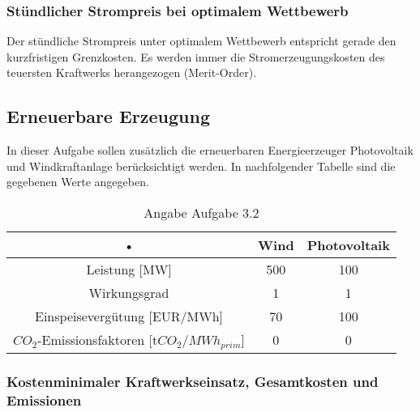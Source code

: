 \documentclass{eegreport}
\begin{document}
\subsubsection{Stündlicher Strompreis bei optimalem Wettbewerb}
Der stündliche Strompreis unter optimalem Wettbewerb entspricht gerade den kurzfristigen Grenzkosten. Es werden immer die Stromerzeugungskosten des teuersten Kraftwerks herangezogen (Merit-Order).


\newpage
\subsection{Erneuerbare Erzeugung}
In dieser Aufgabe sollen zusätzlich die erneuerbaren Energieerzeuger Photovoltaik und
Windkraftanlage berücksichtigt werden. In nachfolgender Tabelle sind die gegebenen Werte angegeben.

\begin{table}[h]
\begin{center}
\begin{tabular}{|c|c|c|}
\hline 
• & \textbf{Wind}  & \textbf{Photovoltaik} \\ 
\hline 
Leistung [MW] & 500 & 100 \\ 
\hline 
Wirkungsgrad & 1 & 1 \\ 
\hline 
Einspeisevergütung [EUR/MWh] & 70 & 100 \\ 
\hline 
$CO_2$-Emissionsfaktoren [t$CO_2$/$MWh_{prim}$] & 0 & 0 \\ 
\hline 
\end{tabular} 
\end{center}
\caption{Angabe Aufgabe 3.2}
\label{eosc}
\end{table}
\newpage
\subsubsection{Kostenminimaler Kraftwerkseinsatz, Gesamtkosten und Emissionen}
\end{document}
